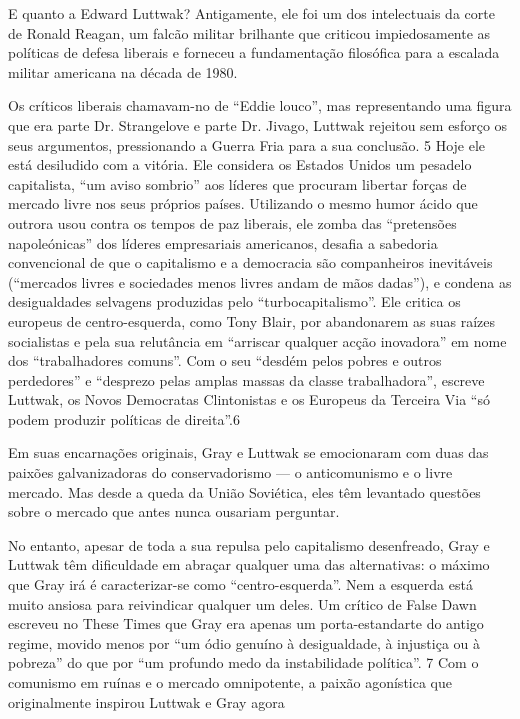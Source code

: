  \par 
E quanto a Edward Luttwak? Antigamente, ele foi um dos intelectuais da corte de Ronald Reagan, um falcão militar brilhante que criticou impiedosamente as políticas de defesa liberais e forneceu a fundamentação filosófica para a escalada militar americana na década de 1980.
 \par 
Os críticos liberais chamavam-no de “Eddie louco”, mas representando uma figura que era parte Dr. Strangelove e parte Dr. Jivago, Luttwak rejeitou sem esforço os seus argumentos, pressionando a Guerra Fria para a sua conclusão. {\color{blue}5} Hoje ele está desiludido com a vitória. Ele considera os Estados Unidos um pesadelo capitalista, “um aviso sombrio” aos líderes que procuram libertar forças de mercado livre nos seus próprios países. Utilizando o mesmo humor ácido que outrora usou contra os tempos de paz liberais, ele zomba das “pretensões napoleónicas” dos líderes empresariais americanos, desafia a sabedoria convencional de que o capitalismo e a democracia são companheiros inevitáveis ​​(“mercados livres e sociedades menos livres andam de mãos dadas”), e condena as desigualdades selvagens produzidas pelo “turbocapitalismo”. Ele critica os europeus de centro-esquerda, como Tony Blair, por abandonarem as suas raízes socialistas e pela sua relutância em “arriscar qualquer acção inovadora” em nome dos “trabalhadores comuns”. Com o seu “desdém pelos pobres e outros perdedores” e “desprezo pelas amplas massas da classe trabalhadora”, escreve Luttwak, os Novos Democratas Clintonistas e os Europeus da Terceira Via “só podem produzir políticas de direita”.{\color{blue}6}
 \par 
Em suas encarnações originais, Gray e Luttwak se emocionaram com duas das paixões galvanizadoras do conservadorismo — o anticomunismo e o livre mercado. Mas desde a queda da União Soviética, eles têm levantado questões sobre o mercado que antes nunca ousariam perguntar.
 \par 
No entanto, apesar de toda a sua repulsa pelo capitalismo desenfreado, Gray e Luttwak têm dificuldade em abraçar qualquer uma das alternativas: o máximo que Gray irá é caracterizar-se como “centro-esquerda”. Nem a esquerda está muito ansiosa para reivindicar qualquer um deles. Um crítico de False Dawn escreveu no These Times que Gray era apenas um porta-estandarte do antigo regime, movido menos por “um ódio genuíno à desigualdade, à injustiça ou à pobreza” do que por “um profundo medo da instabilidade política”. {\color{blue}7} Com o comunismo em ruínas e o mercado omnipotente, a paixão agonística que originalmente inspirou Luttwak e Gray agora
